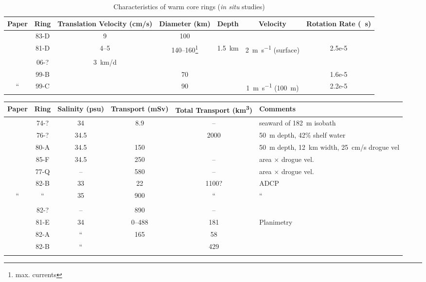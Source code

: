 \begin{landscape}
\begin{table}[h]
	\centering
	\begin{tabular}{ccccccS}
		\toprule
		 	Paper & Ring & Translation Velocity (\si{\cm/\s}) 	& Diameter (\si{\km}) &  Depth  & Velocity & {Rotation Rate (\si[per-mode=reciprocal]{\per\s})}\\ \midrule
	\cite{Churchill1986} & 83-D  & 9	& 100 & & & \\
	\cite{Joyce1984a} & 81-D & \numrange{4}{5} & \numrange{140}{160}\footnote{max. currents} & \SI{1.5}{\km}& \SI{2}{\m\per\s} (surface) & 2.5e-5\\
	\cite{Brink2003} & 06-?& \SI{3}{\km/\day} & & & & \\
	\cite{Wei2008} & 99-B & & 70 & & & 1.6e-5\\ 
	“ 			 & 99-C & & 90 & & \SI{1}{\m\per\s} (\SI{100}{\m}) & 2.2e-5 \\
 		\bottomrule
	\end{tabular}
	\caption{Characteristics of warm core rings (\emph{in situ} studies)}
	\label{tab:wcr}
\end{table}

\newcommand{\model}{$^{\dagger}$}
\begin{table}[h]
	\centering
	\begin{tabular}{ccSSSp{2.0in}}
		\toprule
 Paper 	&	Ring 	&  {Salinity (psu)} & {Transport (\si{mSv})} & {Total Transport (\si{\km^3})} & Comments\\ \midrule
\cite{Morgan1977} & 74-? & 34	& 8.9 & {--}	& seaward of \SI{182}{\m} isobath	\\ 
\cite{Smith1978a} & 76-? & 34.5 & & 2000 & \SI{50}{m} depth, 42\% shelf water\\
\cite{Bisagni1983} & 80-A & 34.5 & 150 & & \SI{50}{m} depth, \SI{12}{\km} width, \SI{25}{\cm /\s} drogue vel \\
\cite{Garfield1987}& 85-F & 34.5 & 250 & {--} & area × drogue vel. \\
\cite{Flagg1987}   & 77-Q & {--} & 580 & {--} & area × drogue vel. \\
\cite{Joyce1992} 	 & 82-B & 33 & 22 & 1100? & ADCP \\
“				 & “    & 35 & 900 & “     & “ \\ \\
\cite{Schlitz2001} & 82-? & {--} & 890 & {--} & \\
 & 81-E & 34	& \numrange{0}{488} & 181 & Planimetry \\  
				& 82-A &   “	& 165	& 58 & \\
				& 82-B &	“ 	& 		& 429 & \\   \\
				

\end{tabular}
\end{table}
\end{landscape}
